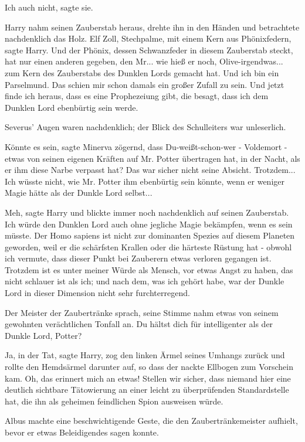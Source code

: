 \glqq Ich auch nicht\grqq{}, sagte sie.

Harry nahm seinen Zauberstab heraus, drehte ihn in den Händen und betrachtete
nachdenklich das Holz. \glqq Elf Zoll, Stechpalme, mit einem Kern aus
Phönixfedern\grqq{}, sagte Harry. \glqq Und der Phönix, dessen Schwanzfeder in
diesem Zauberstab steckt, hat nur einen anderen gegeben, den Mr... wie hieß er
noch, Olive-irgendwas... zum Kern des Zauberstabs des Dunklen Lords gemacht hat.
Und ich bin ein Parselmund. Das schien mir schon damals ein großer Zufall zu
sein. Und jetzt finde ich heraus, dass es eine Prophezeiung gibt, die besagt,
dass ich dem Dunklen Lord ebenbürtig sein werde.\grqq{}

Severus' Augen waren nachdenklich; der Blick des Schulleiters war unleserlich.

\glqq Könnte es sein\grqq{}, sagte Minerva zögernd, \glqq dass
Du-weißt-schon-wer - Voldemort - etwas von seinen eigenen Kräften auf Mr. Potter
übertragen hat, in der Nacht, als er ihm diese Narbe verpasst hat? Das war
sicher nicht seine Absicht. Trotzdem... Ich wüsste nicht, wie Mr. Potter ihm
ebenbürtig sein könnte, wenn er weniger Magie hätte als der Dunkle Lord
selbst...\grqq{}

\glqq Meh\grqq{}, sagte Harry und blickte immer noch nachdenklich auf seinen
Zauberstab. \glqq Ich würde den Dunklen Lord auch ohne jegliche Magie bekämpfen,
wenn es sein müsste. Der Homo sapiens ist nicht zur dominanten Spezies auf
diesem Planeten geworden, weil er die schärfsten Krallen oder die härteste
Rüstung hat - obwohl ich vermute, dass dieser Punkt bei Zauberern etwas verloren
gegangen ist. Trotzdem ist es unter meiner Würde als Mensch, vor etwas Angst zu
haben, das nicht schlauer ist als ich; und nach dem, was ich gehört habe, war
der Dunkle Lord in dieser Dimension nicht sehr furchterregend.\grqq{}

Der Meister der Zaubertränke sprach, seine Stimme nahm etwas von seinem
gewohnten verächtlichen Tonfall an. \glqq Du hältst dich für intelligenter als
der Dunkle Lord, Potter?\grqq{}

\glqq Ja, in der Tat\grqq{}, sagte Harry, zog den linken Ärmel seines Umhangs
zurück und rollte den Hemdsärmel darunter auf, so dass der nackte Ellbogen zum
Vorschein kam. \glqq Oh, das erinnert mich an etwas! Stellen wir sicher, dass
niemand hier eine deutlich sichtbare Tätowierung an einer leicht zu
überprüfenden Standardstelle hat, die ihn als geheimen feindlichen Spion
ausweisen würde.\grqq{}

Albus machte eine beschwichtigende Geste, die den Zaubertränkemeister aufhielt,
bevor er etwas Beleidigendes sagen konnte.


